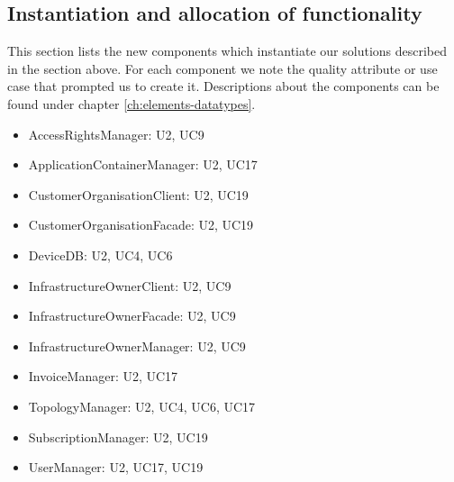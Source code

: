 
\subsection*{Instantiation and allocation of functionality}
    This section lists the new components which instantiate our solutions
    described in the section above. For each component we note the quality
    attribute or use case that prompted us to create it. Descriptions about
    the components can be found under chapter \ref{ch:elements-datatypes}. \\

    \begin{itemize}
        \item AccessRightsManager: U2, UC9
        \item ApplicationContainerManager: U2, UC17
        \item CustomerOrganisationClient: U2, UC19
        \item CustomerOrganisationFacade: U2, UC19
        \item DeviceDB: U2, UC4, UC6
        \item InfrastructureOwnerClient: U2, UC9
        \item InfrastructureOwnerFacade: U2, UC9
        \item InfrastructureOwnerManager: U2, UC9
        \item InvoiceManager: U2, UC17
        \item TopologyManager: U2, UC4, UC6, UC17
        \item SubscriptionManager: U2, UC19
        \item UserManager: U2, UC17, UC19
    \end{itemize}


